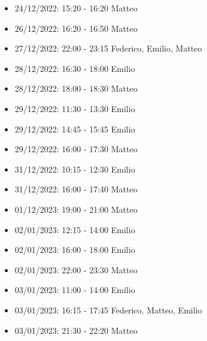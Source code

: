 \begin{itemize}
    \item 24/12/2022: 15:20 - 16:20 Matteo
    \item 26/12/2022: 16:20 - 16:50 Matteo
    \item 27/12/2022: 22:00 - 23:15 Federico, Emilio, Matteo
    \item 28/12/2022: 16:30 - 18:00 Emilio
    \item 28/12/2022: 18:00 - 18:30 Matteo
    \item 29/12/2022: 11:30 - 13:30 Emilio
    \item 29/12/2022: 14:45 - 15:45 Emilio
    \item 29/12/2022: 16:00 - 17:30 Matteo
    \item 31/12/2022: 10:15 - 12:30 Emilio
    \item 31/12/2022: 16:00 - 17:40 Matteo
    \item 01/12/2023: 19:00 - 21:00 Matteo
    \item 02/01/2023: 12:15 - 14:00 Emilio
    \item 02/01/2023: 16:00 - 18:00 Emilio
    \item 02/01/2023: 22:00 - 23:30 Matteo
    \item 03/01/2023: 11:00 - 14:00 Emilio
    \item 03/01/2023: 16:15 - 17:45 Federico, Matteo, Emilio
    \item 03/01/2023: 21:30 - 22:20 Matteo
\end{itemize}
\clearpage